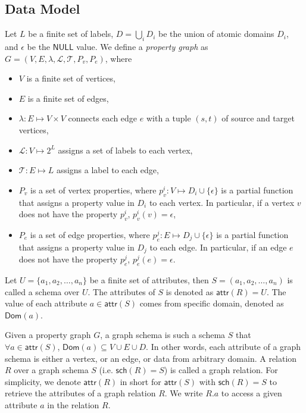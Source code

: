 \documentclass[sigconf, nonacm]{acmart}
\newcommand{\kw}[1]{{\ensuremath {\mathsf{#1}}}\xspace}
\newcommand{\attr}{\kw{attr}}
\newcommand{\sch}{\kw{sch}}
\newcommand{\Dom}{\kw{Dom}}
\newcommand{\vlabel}{\mathcal{L}}
\newcommand{\elabel}{\mathcal{T}}
\begin{document}
\subsection{Data Model}
Let $L$ be a finite set of labels, $D = \bigcup_i D_i$ be the union of atomic domains $D_i$, and $\epsilon$ be the \kw{NULL} value. We define a \textit{property graph} as $G = (V, E, \lambda, \vlabel, \elabel, P_v, P_e)$, where
\begin{itemize}
    \item $V$ is a finite set of vertices,
    \item $E$ is a finite set of edges,
    \item $\lambda: E \mapsto V \times V$ connects each edge $e$ with a tuple $(s, t)$ of source and target vertices,
    \item $\vlabel: V \mapsto 2^L$ assigns a set of labels to each vertex,
    \item $\elabel: E \mapsto L$ assigns a label to each edge,
    \item $P_v$ is a set of vertex properties, where $p_v^i: V \mapsto D_i \cup \{\epsilon\}$ is a partial function that assigns a property value in $D_i$ to each vertex. 
    In particular, if a vertex $v$ does not have the property $p_v^i$, $p_v^i(v) = \epsilon$,
    \item $P_e$ is a set of edge properties, where $p_e^j: E \mapsto D_j \cup \{\epsilon\}$ is a partial function that assigns a property value in $D_j$ to each edge. 
    In particular, if an edge $e$ does not have the property $p_e^j$, $p_e^j(e) = \epsilon$.
\end{itemize}

Let $U = \{a_1, a_2, \ldots, a_n\}$ be a finite set of attributes, then $S = (a_1, a_2, \ldots, a_n)$ is called a schema over $U$. 
The attributes of $S$ is denoted as $\attr(R) = U$. The value of each attribute $a \in \attr(S)$ comes from specific domain, denoted as $\Dom(a)$.

Given a property graph $G$, a graph schema is such a schema $S$ that $\forall a \in \attr(S)$, $\Dom(a) \subseteq V \cup E \cup D$. 
In other words, each attribute of a graph schema is either a vertex, or an edge, or data from arbitrary domain. 
A relation $R$ over a graph schema $S$ (i.e. $\sch(R) = S$) is called a graph relation. 
For simplicity, we denote $\attr(R)$ in short for $\attr(S)$ with $\sch(R) = S$ to retrieve the attributes of a graph relation $R$. 
We write $R.a$ to access a given attribute $a$ in the relation $R$. 
\end{document}
